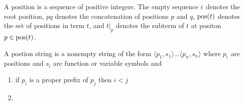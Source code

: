 \documentclass[ 
xcolor={usenames,dvipsnames,svgnames,tablem} 
,handout
]{beamer}
\begin{document}
\begin{frame}
\begin{definition}
A position is a sequence of positive integers.
The empty sequence $\varepsilon$ denotes the root position,
$pq$ denotes the concatenation of positions $p$ and $q$,
$\operatorname{pos}(t)$ denotes the set of positions in term $t$, and $t|_p$ denotes the subterm of $t$ at positon $p\in\operatorname{pos}(t)$.
\end{definition}

\begin{definition}
A postion string is a nonempty string of the form $\langle p_1,s_1\rangle\ldots\langle p_n,s_n\rangle$
where $p_i$ are positions and $s_i$ are function or variable symbols and
\begin{enumerate}
\item
if $p_i$ is a proper prefix of $p_j$ then $i<j$
\item
\end{enumerate}
\end{definition}
\end{frame}

\begin{frame}
\begin{definition}

\end{definition}
\end{frame}
\end{document}
